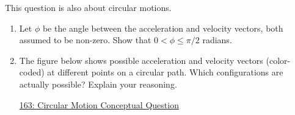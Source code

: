 \documentclass{ximera}
\begin{document}
\begin{question}  \label{Q32frr3r4r4}
This question is also about circular motions.
\begin{enumerate}

\item Let $\phi$ be the angle between the acceleration and velocity vectors, both assumed to be non-zero. Show that $0< \phi \leq \pi/2$ radians.

\item The figure below shows possible acceleration and velocity vectors (color-coded) at different points on a circular path. Which configurations are actually possible? Explain your reasoning.

\begin{onlineOnly}
    \begin{center}
\end{center}
\end{onlineOnly}

\href{https://www.geogebra.org/classic/yzcwddhb}{163: Circular Motion Conceptual Question}

\end{enumerate}

\end{question}
\end{document}
